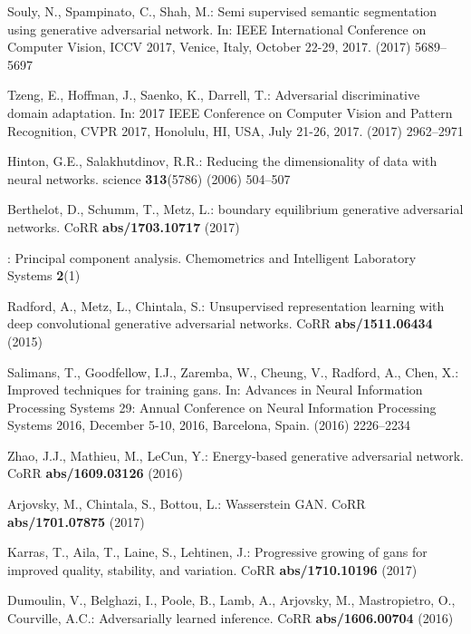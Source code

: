 \documentclass[runningheads]{llncs}
\begin{document}
\begin{thebibliography}{10}
Souly, N., Spampinato, C., Shah, M.:
\newblock Semi supervised semantic segmentation using generative adversarial
  network.
\newblock In: {IEEE} International Conference on Computer Vision, {ICCV} 2017,
  Venice, Italy, October 22-29, 2017. (2017)  5689--5697

Tzeng, E., Hoffman, J., Saenko, K., Darrell, T.:
\newblock Adversarial discriminative domain adaptation.
\newblock In: 2017 {IEEE} Conference on Computer Vision and Pattern
  Recognition, {CVPR} 2017, Honolulu, HI, USA, July 21-26, 2017. (2017)
  2962--2971

Hinton, G.E., Salakhutdinov, R.R.:
\newblock Reducing the dimensionality of data with neural networks.
\newblock science \textbf{313}(5786) (2006)  504--507

Berthelot, D., Schumm, T., Metz, L.:
 boundary equilibrium generative adversarial networks.
\newblock CoRR \textbf{abs/1703.10717} (2017)

:
\newblock Principal component analysis.
\newblock Chemometrics and Intelligent Laboratory Systems \textbf{2}(1)

Radford, A., Metz, L., Chintala, S.:
\newblock Unsupervised representation learning with deep convolutional
  generative adversarial networks.
\newblock CoRR \textbf{abs/1511.06434} (2015)

Salimans, T., Goodfellow, I.J., Zaremba, W., Cheung, V., Radford, A., Chen, X.:
\newblock Improved techniques for training gans.
\newblock In: Advances in Neural Information Processing Systems 29: Annual
  Conference on Neural Information Processing Systems 2016, December 5-10,
  2016, Barcelona, Spain. (2016)  2226--2234

Zhao, J.J., Mathieu, M., LeCun, Y.:
\newblock Energy-based generative adversarial network.
\newblock CoRR \textbf{abs/1609.03126} (2016)

Arjovsky, M., Chintala, S., Bottou, L.:
\newblock Wasserstein {GAN}.
\newblock CoRR \textbf{abs/1701.07875} (2017)

Karras, T., Aila, T., Laine, S., Lehtinen, J.:
\newblock Progressive growing of gans for improved quality, stability, and
  variation.
\newblock CoRR \textbf{abs/1710.10196} (2017)

Dumoulin, V., Belghazi, I., Poole, B., Lamb, A., Arjovsky, M., Mastropietro,
  O., Courville, A.C.:
\newblock Adversarially learned inference.
\newblock CoRR \textbf{abs/1606.00704} (2016)


\end{thebibliography}
\end{document}
